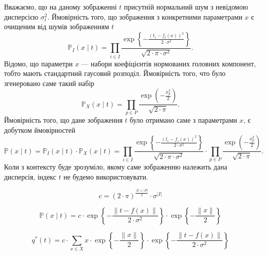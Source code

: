Вважаємо, що на даному зображенні $t$
присутній нормальний шум з невідомою дисперсією $\sigma^2_t$.
Ймовірність того, що зображення з конкретними параметрами $x$
є очищеним від шумів зображенням $t$
\begin{equation*}
  \mathbb{P}_I\left( x \mid t \right)
  = \prod_{i \in I}
    \frac{\exp{\left\{ - \frac{\left( t_i - f_i\left( x \right) \right)^2}
    {2 \cdot \sigma^2} \right\}}}{\sqrt{2 \cdot \pi \cdot \sigma^2}}.
\end{equation*}
Відомо, що параметри $x$ --- набори коефіцієнтів нормованих головних компонент,
тобто мають стандартний гаусовий розподіл.
Ймовірність того, что було згенеровано саме такий набір
\begin{equation*}
  \mathbb{P}_X\left( x \mid t \right)
  = \prod_{p \in P}
    \frac{\exp{\left( - \frac{x_p^2}{2} \right)}}{\sqrt{2 \cdot \pi}}.
\end{equation*}
Ймовірність того,
що дане зображення $t$ було отримано саме з параметрами $x$,
є добутком ймовірностей
\begin{equation*}
  \mathbb{P}\left( x \mid t \right)
  = \mathbb{P}_I\left( x \mid t \right)
    \cdot \mathbb{P}_X\left( x \mid t \right)
  = \prod_{i \in I}
    \frac{\exp{\left\{ - \frac{\left( t_i - f_i\left( x \right) \right)^2}
         {2 \cdot \sigma^2} \right\}}}{\sqrt{2 \cdot \pi \cdot \sigma^2}}
    \cdot
    \prod_{p \in P}
    \frac{\exp{\left( - \frac{x_p^2}{2} \right)}}{\sqrt{2 \cdot \pi}}.
\end{equation*}
Коли з контексту буде зрозуміло,
якому саме зображенню належить дана дисперсія,
індекс $t$ не будемо використовувати.

\begin{equation*}
  c = \left( 2 \cdot \pi \right)^{\frac{\left| I \right| + \left| P \right|}{2}}
      \cdot \sigma^{\left| I \right|}
\end{equation*}

\begin{equation*}
  \mathbb{P}\left( x \mid t \right)
  = c
    \cdot \exp{\left\{ - \frac{\left\| t - f\left( x \right) \right\|}
                              {2 \cdot \sigma^2} \right\}}
    \cdot \exp{\left\{ - \frac{\left\| x \right\|}{2} \right\}}
\end{equation*}

\begin{equation*}
  q^* \left( t \right)
  = c
    \cdot \sum_{x \in X}
      x
      \cdot \exp{\left\{ - \frac{\left\| x \right\|}{2} \right\}}
      \cdot \exp{\left\{ - \frac{\left\| t - f\left( x \right) \right\|}
                                {2 \cdot \sigma^2} \right\}}
\end{equation*}

